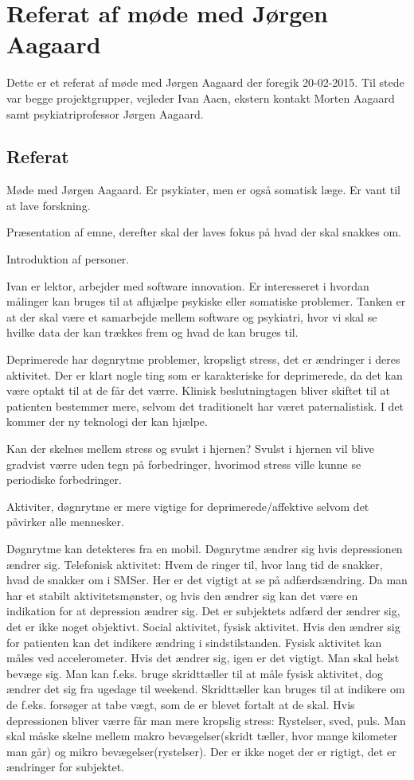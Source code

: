 \chapter{Referat af møde med Jørgen Aagaard}\label{app:moede-med-joergen-referat}
Dette er et referat af møde med Jørgen Aagaard der foregik 20-02-2015. Til stede var begge projektgrupper, vejleder Ivan Aaen, ekstern kontakt Morten Aagaard samt psykiatriprofessor Jørgen Aagaard.

\section{Referat}
Møde med Jørgen Aagaard. Er psykiater, men er også somatisk læge. Er vant til at lave forskning.

Præsentation af emne, derefter skal der laves fokus på hvad der skal snakkes om.

Introduktion af personer.

Ivan er lektor, arbejder med software innovation. Er interesseret i hvordan målinger kan bruges til at afhjælpe psykiske eller somatiske problemer. Tanken er at der skal være et samarbejde mellem software og psykiatri, hvor vi skal se hvilke data der kan trækkes frem og hvad de kan bruges til.

Deprimerede har døgnrytme problemer, kropsligt stress, det er ændringer i deres aktivitet. Der er klart nogle ting som er karakteriske for deprimerede, da det kan være optakt til at de får det værre. Klinisk beslutningtagen bliver skiftet til at patienten bestemmer mere, selvom det traditionelt har været paternalistisk. I det kommer der ny teknologi der kan hjælpe.

Kan der skelnes mellem stress og svulst i hjernen?
Svulst i hjernen vil blive gradvist værre uden tegn på forbedringer, hvorimod stress ville kunne se periodiske forbedringer.

Aktiviter, døgnrytme er mere vigtige for deprimerede/affektive selvom det påvirker alle mennesker. 

Døgnrytme kan detekteres fra en mobil. Døgnrytme ændrer sig hvis depressionen ændrer sig. 
Telefonisk aktivitet: Hvem de ringer til, hvor lang tid de snakker, hvad de snakker om i SMSer. Her er det vigtigt at se på adfærdsændring. Da man har et stabilt aktivitetsmønster, og hvis den ændrer sig kan det være en indikation for at depression ændrer sig. Det er subjektets adfærd der ændrer sig, det er ikke noget objektivt. 
Social aktivitet, fysisk aktivitet. Hvis den ændrer sig for patienten kan det indikere ændring i sindstilstanden. 
Fysisk aktivitet kan måles ved accelerometer. Hvis det ændrer sig, igen er det vigtigt. Man skal helst bevæge sig. Man kan f.eks. bruge skridttæller til at måle fysisk aktivitet, dog ændrer det sig fra ugedage til weekend. Skridttæller kan bruges til at indikere om de f.eks. forsøger at tabe vægt, som de er blevet fortalt at de skal. Hvis depressionen bliver værre får man mere kropslig stress: Rystelser, sved, puls. Man skal måske skelne mellem makro bevægelser(skridt tæller, hvor mange kilometer man går) og mikro bevægelser(rystelser). Der er ikke noget der er rigtigt, det er ændringer for subjektet.

